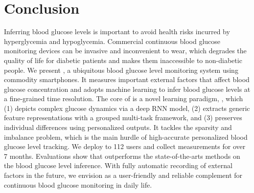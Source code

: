
\section{Conclusion}
\label{sec:conclusion}
Inferring blood glucose levels is important to avoid health risks incurred by hyperglycemia and hypoglycemia.
Commercial continuous blood glucose monitoring devices can be invasive and inconvenient to wear, which degrades the quality of life for diabetic patients and makes them inaccessible to non-diabetic people.
We present \sysname, a ubiquitous blood glucose level monitoring system using commodity smartphones.
It measures important external factors that affect blood glucose concentration and adopts machine learning to infer blood glucose levels at a fine-grained time resolution.
The core of \sysname is a novel learning paradigm, \modelname, which (1) depicts complex glucose dynamics via a deep RNN model, (2) extracts generic feature representations with a grouped multi-task framework, and (3) preserves individual differences using personalized outputs.
It tackles the sparsity and imbalance problem, which is the main hurdle of high-accurate personalized blood glucose level tracking.
We deploy \sysname to 112 users and collect measurements for over 7 months.
Evaluations show that \modelname outperforms the state-of-the-arts methods on the blood glucose level inference.
With fully automatic recording of external factors in the future, we envision \sysname as a user-friendly and reliable complement for continuous blood glucose monitoring in daily life.

